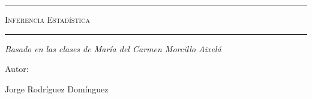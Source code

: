 \begin{titlepage}
\centering
{\bfseries\LARGE \ \par}
\vspace{1cm}
{\scshape\Large \ \par}
\vspace{3cm}
\rule{\linewidth}{0.5mm}
{\scshape\Huge Inferencia Estadística \par}
\rule{\linewidth}{0.5mm}
\vspace{3cm}
{\itshape\Large Basado en las clases de María del Carmen Morcillo Aixelá \par}
\vfill
{\Large Autor: \par}
{\Large Jorge Rodríguez Domínguez \par}
\vfill
\end{titlepage}
\tableofcontents